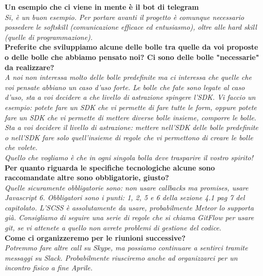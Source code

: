 \documentclass[10 pt,a4paper, openany]{article}
\begin{document}
\textbf{Un esempio che ci viene in mente è il bot di telegram}\\
\textit{Si, è un buon esempio.
  Per portare avanti il progetto è comunque necessario possedere le softskill
  (comunicazione efficace ed entusiasmo), oltre alle hard skill (quelle di programmazione).}\\

\textbf{Preferite che sviluppiamo alcune delle bolle tra quelle da voi proposte o delle bolle che abbiamo pensato noi? Ci sono delle bolle "necessarie" da realizzare?}\\
\textit{A noi non interessa molto delle bolle predefinite ma ci interessa che quelle
  che voi pensate abbiano un caso d'uso forte. Le bolle che fate sono legate al
  caso d'uso, sta a voi decidere a che livello di astrazione spingere l'SDK. Vi
  faccio un esempio: potete fare un SDK che vi permette di fare tutte le form,
  oppure potete fare un SDK che vi permette di mettere diverse bolle insieme,
  comporre le bolle. Sta a voi decidere il livello di astrazione: mettere nell'SDK
  delle bolle predefinite o nell'SDK fare solo quell'insieme di regole che
  vi permettono di creare le bolle che volete.\\
  Quello che vogliamo è che in ogni singola bolla deve trasparire il vostro spirito!}\\

\textbf{Per quanto riguarda le specifiche tecnologiche alcune sono raccomandate altre sono obbligatorie, giusto?}\\
\textit{Quelle sicuramente obbligatorie sono: non usare callbacks ma promises, usare
  Javascript 6. Obbligatori sono i punti: 1, 2, 5 e 6 della sezione 4.1 pag 7
  del capitolato. L'SCSS è assolutamente da usare, probabilmente Meteor lo supporta già.
  Consigliamo di seguire una serie di regole che si chiama GitFlow per usare
  git, se vi attenete a quello non avrete problemi di gestione del codice.}\\

\textbf{Come ci organizzeremo per le riunioni successive?}\\
\textit{Potremmo fare altre call su Skype, ma possiamo continuare a sentirci tramite
    messaggi su Slack. Probabilmente riusciremo anche ad organizzarci per un
    incontro fisico a fine Aprile.}
\end{document}
